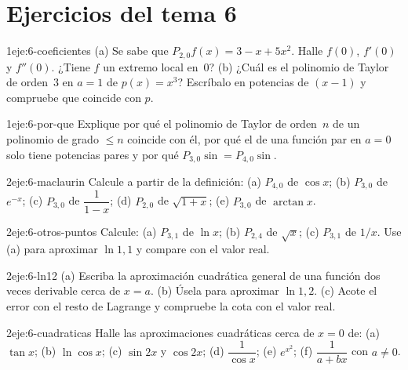 \section*{Ejercicios del tema 6}

\begin{ejercicio}{1}{eje:6-coeficientes}
(a) Se sabe que $P_{2,0}f(x)=3-x+5x^{2}$. Halle $f(0)$, $f'(0)$ y $f''(0)$. ¿Tiene $f$ un extremo local en~0? (b) ¿Cuál es el polinomio de Taylor de orden~3 en $a=1$ de $p(x)=x^{3}$? Escríbalo en potencias de $(x-1)$ y compruebe que coincide con $p$.
\end{ejercicio}

\begin{ejercicio}{1}{eje:6-por-que}
Explique por qué el polinomio de Taylor de orden~$n$ de un polinomio de grado $\le n$ coincide con él, por qué el de una función par en $a=0$ solo tiene potencias pares y por qué $P_{3,0}\sin=P_{4,0}\sin$.
\end{ejercicio}

\begin{ejercicio}{2}{eje:6-maclaurin}
Calcule a partir de la definición: (a) $P_{4,0}$ de $\cos x$; (b) $P_{3,0}$ de $e^{-x}$; (c) $P_{3,0}$ de $\dfrac{1}{1-x}$; (d) $P_{2,0}$ de $\sqrt{1+x}$; (e) $P_{3,0}$ de $\arctan x$.
\end{ejercicio}

\begin{ejercicio}{2}{eje:6-otros-puntos}
Calcule: (a) $P_{3,1}$ de $\ln x$; (b) $P_{2,4}$ de $\sqrt{x}$; (c) $P_{3,1}$ de $1/x$. Use (a) para aproximar $\ln 1{,}1$ y compare con el valor real.
\end{ejercicio}

\begin{ejercicio}{2}{eje:6-ln12}
(a) Escriba la aproximación cuadrática general de una función dos veces derivable cerca de $x=a$. (b) Úsela para aproximar $\ln 1{,}2$. (c) Acote el error con el resto de Lagrange y compruebe la cota con el valor real.
\end{ejercicio}

\begin{ejercicio}{2}{eje:6-cuadraticas}
Halle las aproximaciones cuadráticas cerca de $x=0$ de: (a) $\tan x$; (b) $\ln\cos x$; (c) $\sin 2x$ y $\cos 2x$; (d) $\dfrac{1}{\cos x}$; (e) $e^{x^{2}}$; (f) $\dfrac{1}{a+bx}$ con $a\ne0$.
\end{ejercicio}

